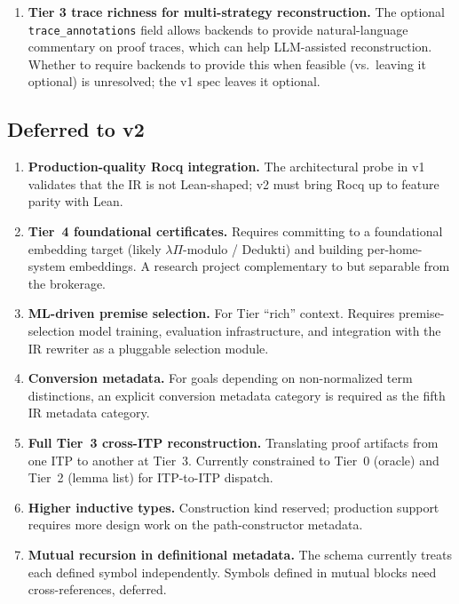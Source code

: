 \documentclass[11pt,letterpaper]{article}
\theoremstyle{definition}
\theoremstyle{remark}
\begin{document}
\begin{enumerate}[leftmargin=2em]
        should be informed that whole portions of the goal are being
        treated as uninterpreted. The current spec calls for diagnostic
        breakdowns in the dispatch UX but does not fully specify the
        UI; this is left to home-system plugin implementations.
  \item \textbf{Tier 3 trace richness for multi-strategy
        reconstruction.} The optional \texttt{trace\_annotations} field
        allows backends to provide natural-language commentary on
        proof traces, which can help LLM-assisted reconstruction.
        Whether to require backends to provide this when feasible
        (vs.\ leaving it optional) is unresolved; the v1 spec leaves
        it optional.
\end{enumerate}

\subsection{Deferred to v2}

\begin{enumerate}[leftmargin=2em]
  \item \textbf{Production-quality Rocq integration.} The architectural
        probe in v1 validates that the IR is not Lean-shaped; v2 must
        bring Rocq up to feature parity with Lean.
  \item \textbf{Tier~4 foundational certificates.} Requires committing
        to a foundational embedding target (likely $\lambda\Pi$-modulo
        / Dedukti) and building per-home-system embeddings. A research
        project complementary to but separable from the brokerage.
  \item \textbf{ML-driven premise selection.} For Tier ``rich''
        context. Requires premise-selection model training, evaluation
        infrastructure, and integration with the IR rewriter as a
        pluggable selection module.
  \item \textbf{Conversion metadata.} For goals depending on
        non-normalized term distinctions, an explicit conversion
        metadata category is required as the fifth IR metadata
        category.
  \item \textbf{Full Tier~3 cross-ITP reconstruction.} Translating
        proof artifacts from one ITP to another at Tier~3. Currently
        constrained to Tier~0 (oracle) and Tier~2 (lemma list) for
        ITP-to-ITP dispatch.
  \item \textbf{Higher inductive types.} Construction kind reserved;
        production support requires more design work on the
        path-constructor metadata.
  \item \textbf{Mutual recursion in definitional metadata.} The schema
        currently treats each defined symbol independently. Symbols
        defined in mutual blocks need cross-references, deferred.
\end{enumerate}
\end{document}
